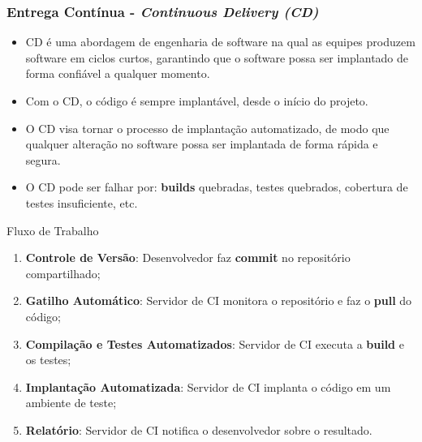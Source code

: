 \documentclass[
	9pt, %
	t, %
]{beamer}
\begin{document}
\begin{frame}
	\frametitle{Entrega Contínua - \textit{Continuous Delivery (CD)}}
	\begin{itemize}
		\item CD é uma abordagem de engenharia de software na qual as equipes produzem software em ciclos curtos, garantindo que o software possa ser implantado de forma confiável a qualquer momento.
		\item Com o CD, o código é sempre implantável, desde o início do projeto.
		\item O CD visa tornar o processo de implantação automatizado, de modo que qualquer alteração no software possa ser implantada de forma rápida e segura.
		\item O CD pode ser falhar por: \textbf{builds} quebradas, testes quebrados, cobertura de testes insuficiente, etc.
	\end{itemize}

	\begin{block}{Fluxo de Trabalho}
		\begin{enumerate}
			\item \textbf{Controle de Versão}: Desenvolvedor faz \textbf{commit} no repositório compartilhado;
			\item \textbf{Gatilho Automático}: Servidor de CI monitora o repositório e faz o \textbf{pull} do código;
			\item \textbf{Compilação e Testes Automatizados}: Servidor de CI executa a \textbf{build} e os testes;
			\item \textbf{Implantação Automatizada}: Servidor de CI implanta o código em um ambiente de teste;
			\item \textbf{Relatório}: Servidor de CI notifica o desenvolvedor sobre o resultado. 
		\end{enumerate}
	\end{block}

\end{frame}
	
\end{document}
